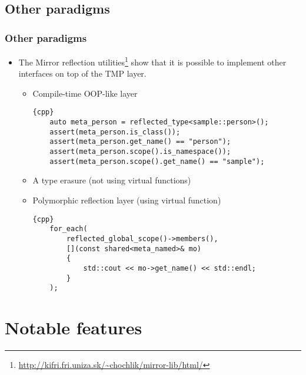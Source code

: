 \documentclass[compress,table,xcolor=table]{beamer}
\begin{document}
\subsection{Other paradigms}
\begin{frame}[fragile]
\frametitle{Other paradigms}
  \begin{itemize}
    \item The Mirror reflection utilities\footnote
      {\tiny{\url{http://kifri.fri.uniza.sk/~chochlik/mirror-lib/html/}}}
      show that it is possible to implement other interfaces on top of the TMP layer.
      \begin{itemize}
        \small
        \item Compile-time OOP-like layer
        \begin{lstlisting}{cpp}
	auto meta_person = reflected_type<sample::person>();
	assert(meta_person.is_class());
	assert(meta_person.get_name() == "person");
	assert(meta_person.scope().is_namespace());
	assert(meta_person.scope().get_name() == "sample");
        \end{lstlisting}
	\item A type erasure (not using virtual functions)
	\item Polymorphic reflection layer (using virtual function)
        \begin{lstlisting}{cpp}
	for_each(
	    reflected_global_scope()->members(),
	    [](const shared<meta_named>& mo)
	    {
	        std::cout << mo->get_name() << std::endl;
	    }
	);
        \end{lstlisting}
      \end{itemize}
  \end{itemize}
\end{frame}

\section{Notable features}
\end{document}
